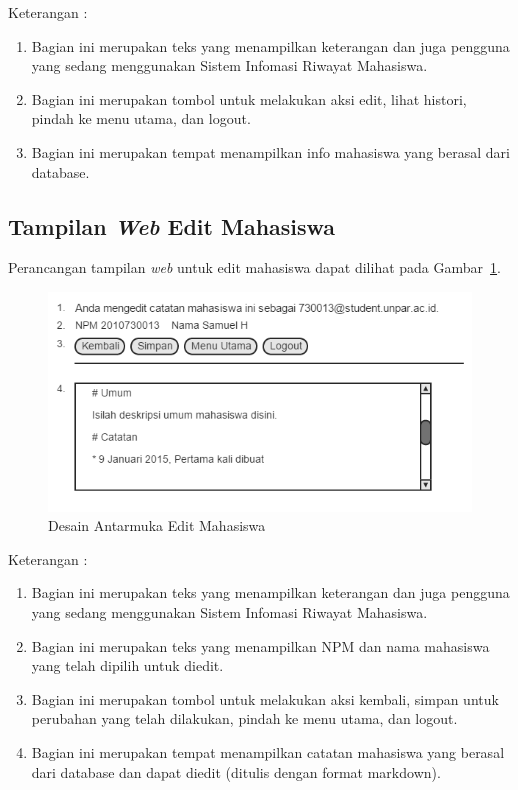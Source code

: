 Keterangan :
\begin{enumerate}[(1)]
\item
Bagian ini merupakan teks yang menampilkan keterangan dan juga pengguna yang sedang menggunakan Sistem Infomasi Riwayat Mahasiswa.
\item
Bagian ini merupakan tombol untuk melakukan aksi edit, lihat histori, pindah
ke menu utama, dan logout.
\item
Bagian ini merupakan tempat menampilkan info mahasiswa yang berasal dari database.
\end{enumerate}

\subsection{Tampilan {\it Web} Edit Mahasiswa}
Perancangan tampilan {\it web} untuk edit mahasiswa dapat dilihat pada Gambar~\ref{fig:editmahasiswa}.
\begin{figure}[ht]
\centering
\includegraphics[scale=0.9]{Gambar/editmahasiswa.png}
\caption[Desain Antarmuka Edit Mahasiswa]{Desain Antarmuka Edit Mahasiswa}
\label{fig:editmahasiswa}
\end{figure}

Keterangan :
\begin{enumerate}[(1)]
\item
Bagian ini merupakan teks yang menampilkan keterangan dan juga pengguna yang
sedang menggunakan Sistem Infomasi Riwayat Mahasiswa.
\item
Bagian ini merupakan teks yang menampilkan NPM dan nama mahasiswa yang telah
dipilih untuk diedit.
\item
Bagian ini merupakan tombol untuk melakukan aksi kembali, simpan untuk perubahan
yang telah dilakukan, pindah ke menu utama, dan logout.
\item
Bagian ini merupakan tempat menampilkan catatan mahasiswa yang berasal dari
database dan dapat diedit (ditulis dengan format markdown).
\end{enumerate}

